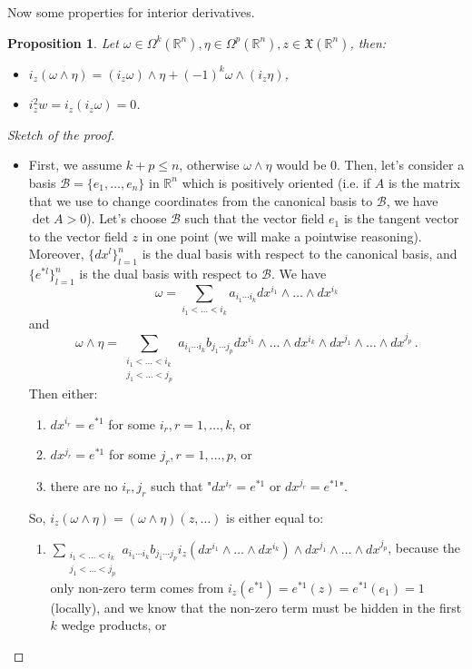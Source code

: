 \documentclass[a4paper,11pt,titlepage, article, oneside]{memoir}
\numberwithin{equation}{section}
\newtheorem{proposition}[theorem]{Proposition}
\theoremstyle{definition}
\theoremstyle{remark}
\newcommand{\rfield}{\mathbb{R}}
\begin{document}
Now some properties for interior derivatives.

\begin{proposition}
 Let $\omega \in \Omega^k(\rfield^n), \eta \in \Omega^p(\rfield^n), z \in \mathfrak{X}(\rfield^n)$, then:
  \begin{itemize}
    \item $i_z (\omega \wedge \eta) = (i_z \omega) \wedge \eta + (-1)^k \omega \wedge (i_z \eta)$,
    \item $i_z^2 w = i_z(i_z \omega) = 0$.
  \end{itemize}
\end{proposition}
\begin{proof}[Sketch of the proof]
$ $
\begin{itemize}
\item First, we assume $k+p \le n$, otherwise $\omega \wedge \eta$ would be 0. Then, let's consider a basis $\mathcal{B} = \{e_1, \ldots, e_n\}$ in $\rfield^n$ which is positively oriented (i.e. if $A$ is the matrix that we use to change coordinates from the canonical basis to $\mathcal{B}$, we have $\det A > 0$). Let's choose $\mathcal{B}$ such that the vector field $e_1$ is the tangent vector to the vector field $z$ in one point (we will make a pointwise reasoning). Moreover, $\{dx^l\}_{l=1}^n$ is the dual basis with respect to the canonical basis, and $\{e^{*l}\}_{l=1}^n$ is the dual basis with respect to $\mathcal{B}$. We have
$$\omega = \sum\limits_{i_1 < \ldots < i_k} a_{i_1 \cdots i_k} dx^{i_1} \wedge \ldots \wedge dx^{i_k}$$
and
$$\omega \wedge \eta = \sum\limits_{\substack{i_1 < \ldots < i_k \\ j_1 < \ldots < j_p }} a_{i_1 \cdots i_k} b_{j_1 \cdots j_p} dx^{i_1} \wedge \ldots \wedge dx^{i_k} \wedge dx^{j_1} \wedge \ldots \wedge dx^{j_p} \, .$$
Then either:
\begin{enumerate}
\item $dx^{i_r} = e^{*1}$ for some $i_r, r= 1, \ldots, k$, or
\item $dx^{j_r} = e^{*1}$ for some $j_r, r= 1, \ldots, p$, or
\item there are no $i_r, j_r$ such that "$dx^{i_r} = e^{*1}$ or $dx^{j_r} = e^{*1}$".
\end{enumerate}
So, $i_z (\omega \wedge \eta) = (\omega \wedge \eta)(z, \ldots)$ is either equal to:
\begin{enumerate}
\item $\sum\limits_{\substack{i_1 < \ldots < i_k \\ j_1 < \ldots < j_p }} a_{i_1 \cdots i_k} b_{j_1 \cdots j_p} i_z \left( dx^{i_1} \wedge \ldots \wedge dx^{i_k} \right ) \wedge dx^{j_1} \wedge \ldots \wedge dx^{j_p}$, because the only non-zero term comes from $i_z(e^{*1}) = e^{*1}(z) = e^{*1}(e_1) = 1$ (locally), and we know that the non-zero term must be hidden in the first $k$ wedge products, or

\end{enumerate}
\end{itemize}
\end{proof}
\end{document}
